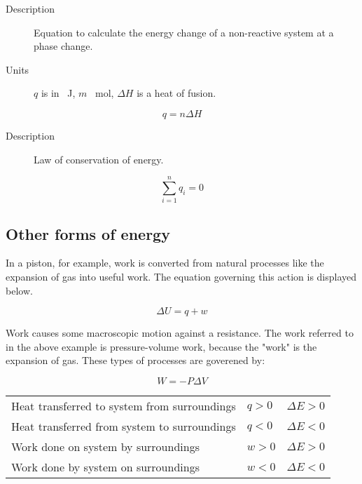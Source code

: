 \begin{description}
  \item[Description] Equation to calculate the energy change of a non-reactive
    system at a phase change.
  \item[Units] $q$ is in \SI{}{\joule}, $m$ \SI{}{\mol}, $\Delta H$ is a heat of
    fusion.
\end{description}
\begin{equation}
  q=n\Delta H
\end{equation}

\begin{description}
  \item[Description] Law of conservation of energy.
\end{description}
\begin{equation}
  \sum_{i=1}^{n} q_i = 0
\end{equation}

\subsection{Other forms of energy}
In a piston, for example, work is converted from natural processes like the
expansion of gas into useful work. The equation governing this action is
displayed below.

\begin{equation}
  \Delta U = q + w
\end{equation}

Work causes some macroscopic motion against a resistance. The work referred to
in the above example is pressure-volume work, because the "work" is the
expansion of gas. These types of processes are goverened by:

\begin{equation}
  W = -P\Delta V
\end{equation}

\begin{table}[]
\centering
\begin{tabular}{lll}
Heat transferred to system from surroundings & $q > 0$ & $\Delta E > 0$ \\
Heat transferred from system to surroundings & $q < 0$ & $\Delta E < 0$ \\
Work done on system by surroundings          & $w > 0$ & $\Delta E > 0$ \\
Work done by system on surroundings          & $w < 0$ & $\Delta E < 0$
\end{tabular}
\end{table}

